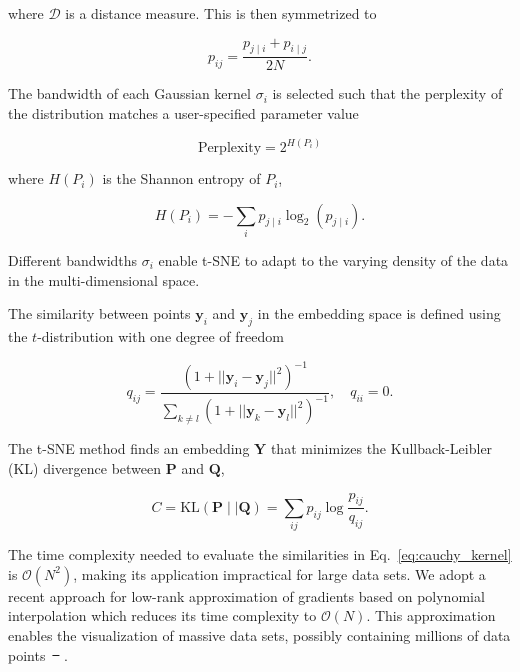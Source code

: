 \documentclass[runningheads]{llncs}
\providecommand{\DIFaddtex}[1]{{\protect\color{blue}\uwave{#1}}} %
\providecommand{\DIFdeltex}[1]{{\protect\color{red}\sout{#1}}}                      %
\providecommand{\DIFaddbegin}{} %
\providecommand{\DIFaddend}{} %
\providecommand{\DIFdelbegin}{} %
\providecommand{\DIFdelend}{} %
\providecommand{\DIFadd}[1]{\texorpdfstring{\DIFaddtex{#1}}{#1}} %
\providecommand{\DIFdel}[1]{\texorpdfstring{\DIFdeltex{#1}}{}} %
\newcommand{\DIFscaledelfig}{0.5}
\newlength{\DIFdelgraphicswidth} %
\newlength{\DIFdelgraphicsheight} %
\newcommand{\DIFaddincludegraphics}[2][]{{\color{blue}\fbox{\DIFOincludegraphics[#1]{#2}}}} %
\newcommand{\DIFdelincludegraphics}[2][]{%
\sbox{\DIFdelgraphicsbox}{\DIFOincludegraphics[#1]{#2}}%
\settoboxwidth{\DIFdelgraphicswidth}{\DIFdelgraphicsbox} %
\settoboxtotalheight{\DIFdelgraphicsheight}{\DIFdelgraphicsbox} %
\scalebox{\DIFscaledelfig}{%
\parbox[b]{\DIFdelgraphicswidth}{\usebox{\DIFdelgraphicsbox}\\[-\baselineskip] \rule{\DIFdelgraphicswidth}{0em}}\llap{\resizebox{\DIFdelgraphicswidth}{\DIFdelgraphicsheight}{%
\setlength{\unitlength}{\DIFdelgraphicswidth}%
\begin{picture}(1,1)%
\thicklines\linethickness{2pt} %
{\color[rgb]{1,0,0}\put(0,0){\framebox(1,1){}}}%
{\color[rgb]{1,0,0}\put(0,0){\line( 1,1){1}}}%
{\color[rgb]{1,0,0}\put(0,1){\line(1,-1){1}}}%
\end{picture}%
}\hspace*{3pt}}} %
} %
\DeclareRobustCommand{\DIFaddbegin}{\DIFOaddbegin \let\includegraphics\DIFaddincludegraphics} %
\DeclareRobustCommand{\DIFaddend}{\DIFOaddend \let\includegraphics\DIFOincludegraphics} %
\DeclareRobustCommand{\DIFdelbegin}{\DIFOdelbegin \let\includegraphics\DIFdelincludegraphics} %
\DeclareRobustCommand{\DIFdelend}{\DIFOaddend \let\includegraphics\DIFOincludegraphics} %
\begin{document}
\noindent where $\mathcal{D}$ is a distance measure. This is then symmetrized to

\begin{equation}
p_{ij} = \frac{p_{j \mid i} + p_{i \mid j}}{2N}.
\label{eq:symmetrize}
\end{equation}

The bandwidth of each Gaussian kernel $\sigma_i$ is selected such that the
perplexity of the distribution matches a user-specified parameter value

\begin{equation}
\text{Perplexity} = 2^{H(P_i)}
\end{equation}

\noindent where $H(P_i)$ is the Shannon entropy of $P_i$,

\begin{equation}
H(P_i) = -\sum_i p_{j \mid i} \log_2 (p_{j \mid i}).
\end{equation}

\noindent Different bandwidths $\sigma_i$ enable t-SNE to adapt to the varying
density of the data in the multi-dimensional space.

The similarity between points $\mathbf{y}_i$ and $\mathbf{y}_j$ in the
embedding space is defined using the $t$-distribution with one degree of
freedom

\begin{equation}
q_{ij} = \frac{\left ( 1 + || \mathbf{y}_i - \mathbf{y}_j ||^2 \right )^{-1}}{\sum_{k \neq l}\left ( 1 + || \mathbf{y}_k - \mathbf{y}_l ||^2 \right )^{-1}},
\quad q_{ii} = 0.
\label{eq:cauchy_kernel}
\end{equation}

The t-SNE method finds an embedding $\mathbf{Y}$ that minimizes the
Kullback-Leibler (KL) divergence between $\mathbf{P}$ and $\mathbf{Q}$,

\begin{equation}
C = \text{KL}(\mathbf{P} \mid \mid \mathbf{Q}) = \sum_{ij} p_{ij} \log \frac{p_{ij}}{q_{ij}}.
\label{eq:kl_divergence}
\end{equation}

The time complexity needed to evaluate the similarities in
Eq.~\ref{eq:cauchy_kernel} is $\mathcal{O}(N^2)$, making its application
impractical for large data sets. We adopt a recent approach for low-rank
approximation of gradients based on polynomial interpolation which reduces its
time complexity to $\mathcal{O}(N)$. This approximation enables the
visualization of massive data sets, possibly containing millions of data
points~\DIFdelbegin \DIFdel{\mbox{%
\cite{fi_tsne}}\hspace{0pt}%
}\DIFdelend \DIFaddbegin \DIFadd{\mbox{%
\cite{Linderman2019}}\hspace{0pt}%
}\DIFaddend .
\end{document}

